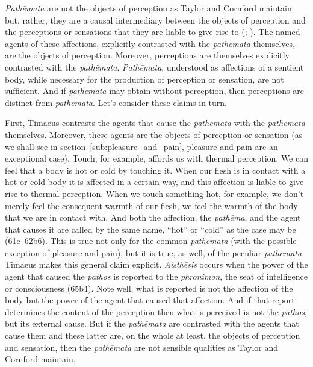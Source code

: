 \emph{Pathēmata} are not the objects of perception as Taylor and Cornford maintain but, rather, they are a causal intermediary between the objects of perception and the perceptions or sensations that they are liable to give rise to (\citealt[138]{OBrien:1984ji}; \citealt{Brisson:1997qr}). The named agents of these affections, explicitly contrasted with the \emph{pathēmata} themselves, are the objects of perception. Moreover, perceptions are themselves explicitly contrasted with the \emph{pathēmata}. \emph{Pathēmata}, understood as affections of a sentient body, while necessary for the production of perception or sensation, are not sufficient. And if \emph{pathēmata} may obtain without perception, then perceptions are distinct from \emph{pathēmata}. Let's consider these claims in turn.

First, Timaeus contrasts the agents that cause the \emph{pathēmata} with the \emph{pathēmata} themselves. Moreover, these agents are the objects of perception or sensation (as we shall see in section~\ref{sub:pleasure_and_pain}, pleasure and pain are an exceptional case). Touch, for example, affords us with thermal perception. We can feel that a body is hot or cold by touching it. When our flesh is in contact with a hot or cold body it is affected in a certain way, and this affection is liable to give rise to thermal perception. When we touch something hot, for example, we don't merely feel the consequent warmth of our flesh, we feel the warmth of the body that we are in contact with. And both the affection, the \emph{pathēma}, and the agent that causes it are called by the same name, ``hot'' or ``cold'' as the case may be (61e--62b6). This is true not only for the common \emph{pathēmata} (with the possible exception of pleasure and pain), but it is true, as well, of the peculiar \emph{pathēmata}. Timaeus makes this general claim explicit. \emph{Aisthēsis} occurs when the power of the agent that caused the \emph{pathos} is reported to the \emph{phronimon}, the seat of intelligence or consciousness (65b4). Note well, what is reported is not the affection of the body but the power of the agent that caused that affection. And if that report determines the content of the perception then what is perceived is not the \emph{pathos}, but its external cause. But if the \emph{pathēmata} are contrasted with the agents that cause them and these latter are, on the whole at least, the objects of perception and sensation, then the \emph{pathēmata} are not sensible qualities as Taylor and Cornford maintain.

